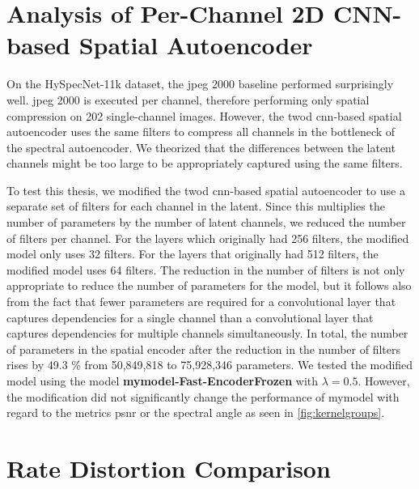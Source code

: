 \section[Analysis of Per-Channel Autoencoder]{Analysis of Per-Channel 2D CNN-based Spatial Autoencoder}
On the HySpecNet-11k dataset, the \ac{jpeg} 2000 baseline performed surprisingly well. \Ac{jpeg} 2000 is executed per channel, therefore performing only spatial compression on 202 single-channel images. However, the \ac{twod} \ac{cnn}-based spatial autoencoder uses the same filters to compress all channels in the bottleneck of the spectral autoencoder. We theorized that the differences between the latent channels might be too large to be appropriately captured using the same filters. 

To test this thesis, we modified the \ac{twod} \ac{cnn}-based spatial autoencoder to use a separate set of filters for each channel in the latent. Since this multiplies the number of parameters by the number of latent channels, we reduced the number of filters per channel. For the layers which originally had 256 filters, the modified model only uses 32 filters. For the layers that originally had 512 filters, the modified model uses 64 filters. The reduction in the number of filters is not only appropriate to reduce the number of parameters for the model, but it follows also from the fact that fewer parameters are required for a convolutional layer that captures dependencies for a single channel than a convolutional layer that captures dependencies for multiple channels simultaneously. In total, the number of parameters in the spatial encoder after the reduction in the number of filters rises by 49.3 \% from 50,849,818 to 75,928,346 parameters. We tested the modified model using the model \textbf{\ac{mymodel}-Fast-EncoderFrozen} with $\lambda=0.5$. However, the modification did not significantly change the performance of \ac{mymodel} with regard to the metrics \ac{psnr} or the spectral angle as seen in \autoref{fig:kernelgroups}. 

\section{Rate Distortion Comparison\label{sec:ch5heur}}

